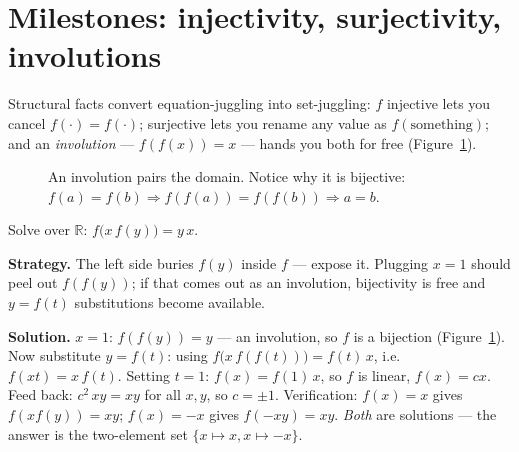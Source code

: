 \section{Milestones: injectivity, surjectivity, involutions}
Structural facts convert equation-juggling into set-juggling:
$f$ injective lets you cancel $f(\cdot)=f(\cdot)$; surjective lets you
rename any value as $f(\text{something})$; and an
\emph{involution} --- $f(f(x))=x$ --- hands you both
for free (Figure~\ref{fig:invol}).
\begin{figure}[ht]\centering

\caption{An involution pairs the domain. Notice why it is bijective:
$f(a)=f(b) \Rightarrow f(f(a))=f(f(b)) \Rightarrow a=b$.}
\label{fig:invol}
\end{figure}

\begin{example}
Solve over $\mathbb R$: $f\bigl(x\,f(y)\bigr) = y\,x$.

\textbf{Strategy.} The left side buries $f(y)$ inside $f$ --- expose it.
Plugging $x=1$ should peel out $f(f(y))$; if that comes out as an
involution, bijectivity is free and $y=f(t)$ substitutions become
available.

\textbf{Solution.} $x=1$: $f(f(y)) = y$ --- an involution, so $f$ is a
bijection (Figure~\ref{fig:invol}). Now substitute $y=f(t)$: using
$f\bigl(x\,f(f(t))\bigr) = f(t)\,x$, i.e.\ $f(xt) = x\,f(t)$. Setting
$t=1$: $f(x) = f(1)\,x$, so $f$ is linear, $f(x)=cx$. Feed back:
$c^2\,xy = xy$ for all $x,y$, so $c = \pm 1$. Verification: $f(x)=x$
gives $f(xf(y)) = xy$; $f(x)=-x$ gives $f(-xy) = xy$. \emph{Both} are
solutions --- the answer is the two-element set $\{x\mapsto x,
x\mapsto -x\}$.
\end{example}

